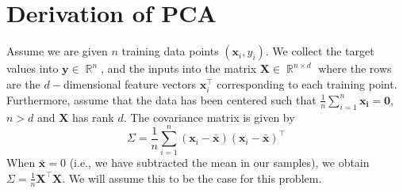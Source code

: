 \documentclass{article}
\newcommand{\Question}[1]{\Large \section{ #1 } \normalsize}
\DeclareMathOperator{\R}{\mathbb{R}}
\newcommand{\mat}[1]{\mathbf{#1}}
\renewcommand{\vec}[1]{\boldsymbol{\mathbf{#1}}}
\begin{document}
\fontsize{12}{15}\selectfont

\Question {Derivation of PCA} 

Assume we are given $n$ training data points $(\vec{x}_i, y_i)$. We
collect the target values into $\vec{y} \in \R^n$, and the inputs into
the matrix $\mat{X} \in \R^{n\times d}$ where the rows are the
$d-$dimensional feature vectors $\vec x_i^\top$ corresponding to each
training point. Furthermore, assume that the data has been centered such that $\frac{1}{n}\sum_{i=1}^n
\vec{x_i} = \vec{0}$, $n > d$ and $\mat{X}$ has rank $d$. The covariance matrix is given by
\begin{equation*}
\Sigma = \frac{1}{n} \sum_{i=1}^n (\vec{x}_i - \bar{\vec{x}})(\vec{x}_i - \bar{\vec{x}})^\top
\end{equation*}
When $\bar{\vec{x}} = 0$ (i.e., we have subtracted the mean in our
samples), we obtain $\Sigma = \frac{1}{n}\mat{X}^\top\mat{X}$. We will assume this to be the case for this problem.
\end{document}
